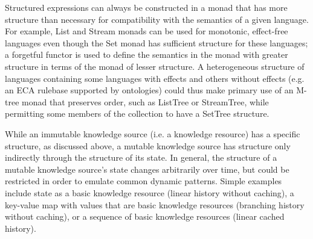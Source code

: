 \documentclass[runningheads]{llncs}
\begin{document}
Structured expressions can always be constructed in a monad that has more structure than necessary for compatibility with the semantics of a given language.
For example, List and Stream monads can be used for monotonic, effect-free languages even though the Set monad has sufficient structure for these languages;
a forgetful functor is used to define the semantics in the monad with greater structure in terms of the monad of lesser structure.
A heterogeneous structure of languages containing some languages with effects and others without effects (e.g. an ECA rulebase supported by ontologies) could thus make primary use of an M-tree monad that preserves order, such as ListTree or StreamTree, while permitting some members of the collection to have a SetTree structure. 


While an immutable knowledge source (i.e. a knowledge resource) has a specific structure, as discussed above, a mutable knowledge source has structure only indirectly through the structure of its state. In general, the structure of a mutable knowledge source's state changes arbitrarily over time, but could be restricted in order to emulate common dynamic patterns. Simple examples include state as a basic knowledge resource (linear history without caching), a key-value map with values that are basic knowledge resources (branching history without caching), or a sequence of basic knowledge resources (linear cached history). 
\end{document}
